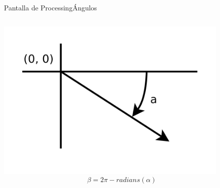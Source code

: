 \begin{frame}{Pantalla de Processing}{Ángulos}
  \begin{columns}
    \includegraphics [width=0.9\textwidth]{arcProcessing.png}
    \begin{equation*}
      \beta = 2\pi - radians(\alpha)
    \end{equation*}
  \end{columns}
\end{frame}





